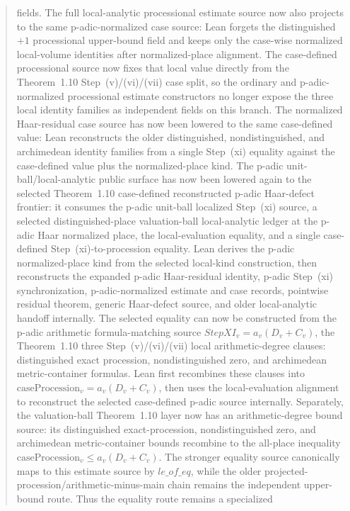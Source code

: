 \documentclass[11pt]{article}
\theoremstyle{plain}
\theoremstyle{definition}
\theoremstyle{remark}
\begin{document}
\begin{abstract}
fields.  The full local-analytic processional estimate source now also projects
to the same p-adic-normalized case source: Lean forgets the distinguished
\(+1\) processional upper-bound field and keeps only the case-wise normalized
local-volume identities after normalized-place alignment.  The case-defined
processional source now fixes that local value directly from the
Theorem~1.10 Step~(v)/(vi)/(vii) case split, so the ordinary and
p-adic-normalized processional estimate constructors no longer expose the three
local identity families as independent fields on this branch.  The normalized
Haar-residual case source has now been lowered to the same case-defined
value: Lean reconstructs the older distinguished, nondistinguished, and
archimedean identity families from a single Step~(xi) equality against the
case-defined value plus the normalized-place kind.  The p-adic
unit-ball/local-analytic public surface has now been lowered again to the
selected Theorem~1.10 case-defined reconstructed p-adic Haar-defect frontier:
it consumes the p-adic unit-ball localized Step~(xi) source, a selected
distinguished-place valuation-ball local-analytic ledger at the p-adic Haar
normalized place, the local-evaluation equality, and a single case-defined
Step~(xi)-to-procession equality.  Lean derives the p-adic normalized-place
kind from the selected local-kind construction, then reconstructs the expanded
p-adic Haar-residual identity, p-adic Step~(xi) synchronization,
p-adic-normalized estimate and case records, pointwise residual theorem,
generic Haar-defect source, and older local-analytic handoff internally.
The selected equality can now be constructed from the p-adic arithmetic
formula-matching source \(StepXI_v=a_v(D_v+C_v)\), the Theorem~1.10
three Step~(v)/(vi)/(vii) local arithmetic-degree clauses: distinguished
exact procession, nondistinguished zero, and archimedean metric-container
formulas.  Lean first recombines these clauses into
\(\mathrm{caseProcession}_v=a_v(D_v+C_v)\), then uses the local-evaluation
alignment to reconstruct the selected case-defined p-adic source internally.
Separately, the valuation-ball Theorem~1.10 layer now has an
arithmetic-degree bound source: its distinguished exact-procession,
nondistinguished zero, and archimedean metric-container bounds recombine to the
all-place inequality
\(\mathrm{caseProcession}_v\leq a_v(D_v+C_v)\).  The stronger equality source
canonically maps to this estimate source by \(le\_of\_eq\), while the older
projected-procession/arithmetic-minus-main chain remains the independent
upper-bound route.  Thus the equality route remains a specialized

\end{abstract}
\end{document}
